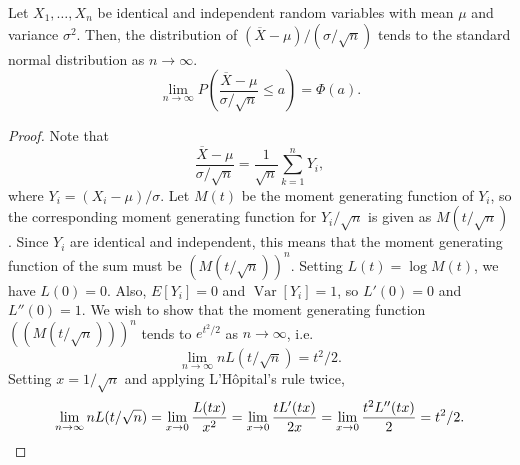 \documentclass[11pt]{article}
\newcommand\E[1]{E\left[#1\right]}
\newcommand\var[1]{\operatorname{Var}[#1]}
\theoremstyle{definition}
\theoremstyle{remark}
\numberwithin{equation}{module}
\begin{document}
    \begin{theorem}
        Let $X_1, \dots, X_n$ be identical and independent random variables with
        mean $\mu$ and variance $\sigma^2$. Then, the distribution of $(\overline{X}
        - \mu)/ (\sigma / \sqrt{n})$ tends to the standard normal distribution as $n
        \to \infty$. \[
            \lim_{n \to \infty} P\left(\frac{\overline{X} - \mu}{\sigma / \sqrt{n}}
            \leq a  \right) = \Phi(a).
        \] 
    \end{theorem}
    \begin{proof}
        Note that \[
            \frac{\overline{X} - \mu}{\sigma / \sqrt{n}} = \frac{1}{\sqrt{n}}\sum_{k
            = 1}^n Y_i,
        \] where $Y_i = (X_i - \mu) / \sigma$. Let $M(t)$ be the moment generating
        function of $Y_i$, so the corresponding moment generating function for $Y_i
        / \sqrt{n}$ is given as $M(t / \sqrt{n})$. Since $Y_i$ are identical and
        independent, this means that the moment generating function of the sum must
        be $(M(t / \sqrt{n}))^n$. Setting $L(t) = \log M(t)$, we have $L(0) = 0$.
        Also, $\E{Y_i} = 0$ and $\var{Y_i} = 1$, so $L'(0) = 0$ and $L''(0) = 1$.
        We wish to show that the moment generating function $((M(t / \sqrt{n})))^n$
        tends to $e^{t^2 / 2}$ as $n \to \infty$, i.e.\ \[
            \lim_{n \to \infty} nL(t / \sqrt{n}) = t^2 / 2.
        \] Setting $x = 1 / \sqrt{n}$ and applying L'H\^opital's rule twice, \[
            \lim_{n \to \infty} nL(t / \sqrt{n}) = \lim_{x \to 0}
            \frac{L(tx)}{x^2} = \lim_{x \to 0} \frac{t L'(tx)}{2x} = \lim_{x \to 0}
            \frac{t^2 L''(tx)}{2} = t^2 /2. \qedhere
        \] 
    \end{proof}
\end{document}
